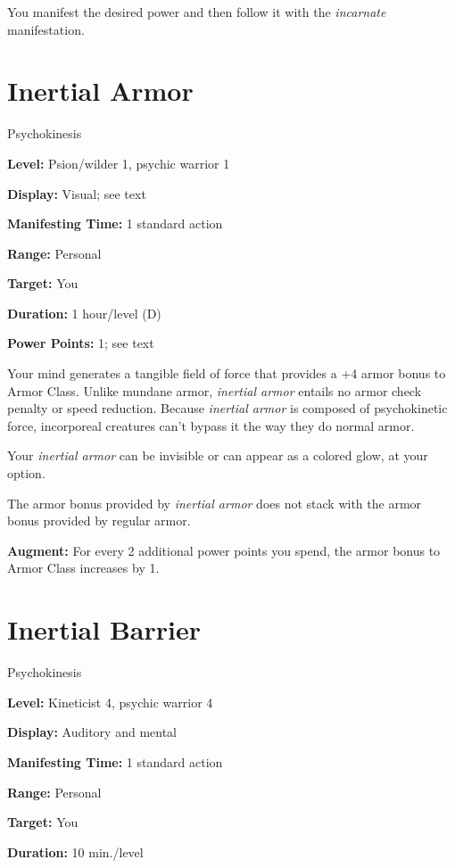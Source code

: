 \documentclass{article}
\begin{document}
You manifest the desired power and then follow it with the \textit{incarnate }manifestation.

\vspace{12pt}
\section*{Inertial Armor}

Psychokinesis

\textbf{Level:} Psion/wilder 1, psychic warrior 1

\textbf{Display:} Visual; see text

\textbf{Manifesting Time:} 1 standard action

\textbf{Range:} Personal

\textbf{Target:} You

\textbf{Duration:} 1 hour/level (D)

\textbf{Power Points:} 1; see text

Your mind generates a tangible field of force that provides a +4 armor bonus to 
Armor Class. Unlike mundane armor, \textit{inertial armor }entails no armor check 
penalty or speed reduction. Because \textit{inertial armor }is composed of psychokinetic 
force, incorporeal creatures can't bypass it the way they do normal armor.

Your \textit{inertial armor }can be invisible or can appear as a colored glow, 
at your option.

The armor bonus provided by \textit{inertial armor }does not stack with the armor 
bonus provided by regular armor.

\textbf{Augment:} For every 2 additional power points you spend, the armor bonus 
to Armor Class increases by 1.

\vspace{12pt}
\section*{Inertial Barrier}

Psychokinesis

\textbf{Level:} Kineticist 4, psychic warrior 4

\textbf{Display:} Auditory and mental

\textbf{Manifesting Time:} 1 standard action

\textbf{Range:} Personal

\textbf{Target:} You

\textbf{Duration:} 10 min./level
\end{document}
